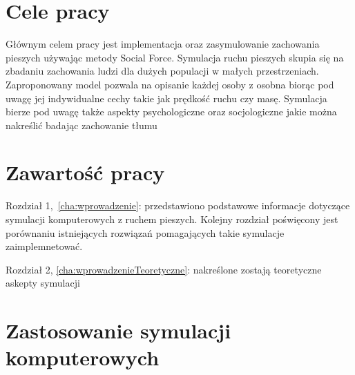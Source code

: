 
\section{Cele pracy}
\label{sec:celePracy}

Głównym celem pracy jest implementacja oraz zasymulowanie zachowania pieszych używając metody Social Force. Symulacja ruchu pieszych skupia się na zbadaniu zachowania ludzi dla dużych populacji w małych przestrzeniach. Zaproponowany model pozwala na opisanie każdej osoby z osobna biorąc pod uwagę jej indywidualne cechy takie jak prędkość ruchu czy masę. Symulacja bierze pod uwagę także aspekty psychologiczne oraz socjologiczne jakie można nakreślić badając zachowanie tłumu


\section{Zawartość pracy}
\label{sec:zawartoscPracy}

Rozdział 1,~\ref{cha:wprowadzenie}: przedstawiono podstawowe informacje dotyczące symulacji komputerowych z ruchem pieszych. Kolejny rozdział poświęcony jest porównaniu istniejących rozwiązań pomagających takie symulacje zaimplemnetować.

Rozdział 2, \ref{cha:wprowadzenieTeoretyczne}: nakreślone zostają teoretyczne askepty symulacji

\section{Zastosowanie symulacji komputerowych}
\label{sec:ZastosowanieSymulacji}



















